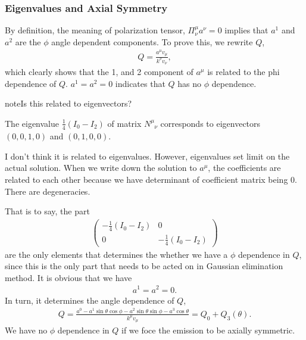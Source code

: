 \documentclass[letterpaper,12pt,english]{sphinxmanual}
\begin{document}
\subsubsection{Eigenvalues and Axial Symmetry}
\label{\detokenize{collective/dispersion-relation:eigenvalues-and-axial-symmetry}}
By definition, the meaning of polarization tensor, \(\Pi^\mu_\nu a^\nu=0\) implies that \(a^1\) and \(a^2\) are the \(\phi\) angle dependent components. To prove this, we rewrite \(Q\),
\begin{equation*}
\begin{split}Q = \frac{a^\mu v_\mu}{k^\nu v_\nu},\end{split}
\end{equation*}
which clearly shows that the 1, and 2 component of \(a^\mu\) is related to the phi dependence of \(Q\). \(a^1=a^2=0\) indicates that \(Q\) has no \(\phi\) dependence.

\begin{sphinxadmonition}{note}{Is this related to eigenvectors?}

The eigenvalue \(\frac{1}{4}(I_0-I_2)\) of matrix \(N^\mu_{\phantom{\mu}\nu}\) corresponds to eigenvectors \((0,0,1,0)\) and \((0,1,0,0)\).

I don't think it is related to eigenvalues. However, eigenvalues set limit on the actual solution. When we write down the solution to \(a^\mu\), the coefficients are related to each other because we have determinant of coefficient matrix being 0. There are degeneracies.
\end{sphinxadmonition}

That is to say, the part
\begin{equation*}
\begin{split}\begin{pmatrix}
-\frac{1}{4}(I_0-I_2) & 0 \\
0 & -\frac{1}{4}(I_0-I_2)
\end{pmatrix}\end{split}
\end{equation*}
are the only elements that determines the whether we have a \(\phi\) dependence in \(Q\), since this is the only part that needs to be acted on in Gaussian elimination method. It is obvious that we have
\begin{equation*}
\begin{split}a^1=a^2=0.\end{split}
\end{equation*}
In turn, it determines the angle dependence of \(Q\),
\begin{equation*}
\begin{split}Q =  \frac{a^0 - a^1\sin\theta\cos\phi - a^2\sin\theta\sin\phi - a^3 \cos\theta}{k^\mu v_\mu} = Q_0 + Q_3(\theta).\end{split}
\end{equation*}
We have no \(\phi\) dependence in \(Q\) if we foce the emission to be axially symmetric.
\end{document}
